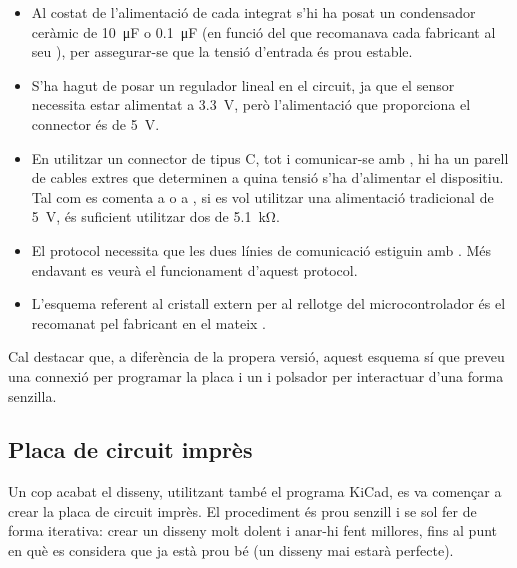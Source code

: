 \begin{itemize}
    \item Al costat de l'alimentació de cada integrat s'hi ha posat un
    condensador ceràmic de
    \SI[round-mode=places,round-precision=0]{10}{\micro\farad} o
    \SI[round-mode=places,round-precision=1]{0.1}{\micro\farad}
    (en funció del que recomanava
    cada fabricant al seu ), per assegurar-se que la tensió
    d'entrada és prou estable.
    \item S'ha hagut de posar un regulador lineal en el circuit, ja que el
    sensor necessita estar alimentat a
    \SI[round-mode=places,round-precision=1]{3.3}{\volt},
    però l'alimentació que proporciona
    el connector  és de \SI[round-mode=places,round-precision=0]{5}{\volt}.
    \item En utilitzar un connector de tipus C, tot i comunicar-se amb
    , hi ha un parell de cables extres que determinen a quina tensió
    s'ha d'alimentar el dispositiu. Tal com es comenta a \cite{Axelson2015USB}
    o a \cite{TypeCIntro}, si es vol utilitzar una alimentació tradicional de 
    \SI[round-mode=places,round-precision=0]{5}{\volt}, és suficient
    utilitzar dos  de
    \SI[round-mode=places,round-precision=1]{5.1}{\kilo\ohm}.
    \item El protocol  necessita que les dues línies de comunicació
    estiguin amb . Més endavant es veurà el funcionament d'aquest
    protocol.
    \item L'esquema referent al cristall extern per al rellotge del microcontrolador
    és el recomanat pel fabricant en el mateix  \cite{AtMega32u4}.
\end{itemize}

Cal destacar que, a diferència de la propera versió, aquest esquema sí que preveu
una connexió  per programar la placa i un  i polsador per
interactuar d'una forma senzilla.

\subsection{Placa de circuit imprès}

Un cop acabat el disseny, utilitzant també el programa KiCad, es va començar a
crear la placa de circuit imprès. El procediment és prou senzill i se sol fer
de forma iterativa: crear un disseny molt dolent i anar-hi fent millores, fins
al punt en què es considera que ja està prou bé (un disseny mai estarà perfecte).

